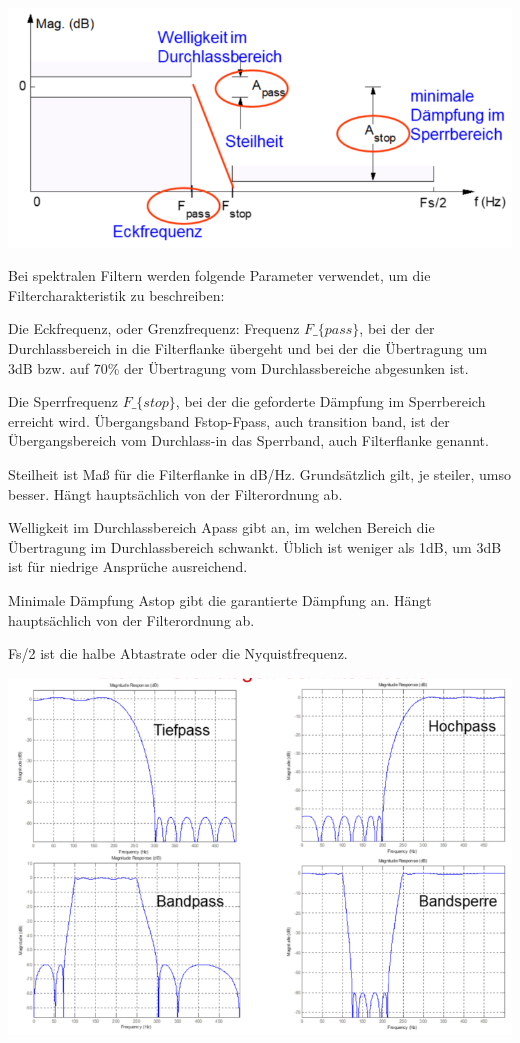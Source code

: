 \documentclass[a4paper]{article}
\begin{document}
\begin{multicols}{3}
  \begin{itemize*}
    \item \includegraphics[width=.5\linewidth]{Assets/Biosignalverarbeitung-Filtertheorie.png}
    \item Bei spektralen Filtern werden folgende Parameter verwendet, um die Filtercharakteristik zu beschreiben:
    \begin{itemize*}
      \item Die Eckfrequenz, oder Grenzfrequenz: Frequenz $F\_\{pass\}$, bei der der Durchlassbereich in die Filterflanke übergeht und bei der die Übertragung um 3dB bzw. auf 70\% der Übertragung vom Durchlassbereiche abgesunken ist.
      \item Die Sperrfrequenz $F\_\{stop\}$, bei der die geforderte Dämpfung im Sperrbereich erreicht wird. Übergangsband Fstop-Fpass, auch transition band, ist der Übergangsbereich vom Durchlass-in das Sperrband, auch Filterflanke genannt. \item Steilheit ist Maß für die Filterflanke in dB/Hz. Grundsätzlich gilt, je steiler, umso besser. Hängt hauptsächlich von der Filterordnung ab.
      \item Welligkeit im Durchlassbereich Apass gibt an, im welchen Bereich die Übertragung im Durchlassbereich schwankt. Üblich ist weniger als 1dB, um 3dB ist für niedrige Ansprüche ausreichend.
      \item Minimale Dämpfung Astop gibt die garantierte Dämpfung an. Hängt hauptsächlich von der Filterordnung ab.
      \item Fs/2 ist die halbe Abtastrate oder die Nyquistfrequenz.
    \end{itemize*}
    \item \includegraphics[width=.5\linewidth]{Assets/Biosignalverarbeitung-Filtertheorie2.png}

\end{itemize*}
\end{multicols}
\end{document}
